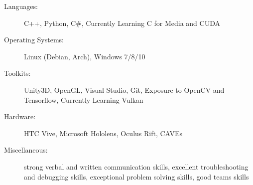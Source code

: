
\begin{description}
	\item[Languages:]
		C++, Python, C\#, Currently Learning C for Media and CUDA
		
	\item[Operating Systems:]
		Linux (Debian, Arch), Windows 7/8/10
		
	\item[Toolkits:]
		Unity3D, OpenGL, Visual Studio, Git, Exposure to 
		OpenCV and Tensorflow, Currently Learning Vulkan

	\item[Hardware:]
		HTC Vive, Microsoft Hololens, Oculus Rift, CAVEs

	\item[Miscellaneous:]
		strong verbal and written communication skills, excellent 
		troubleshooting and debugging skills, exceptional problem 
		solving skills, good teams skills
\end{description}
